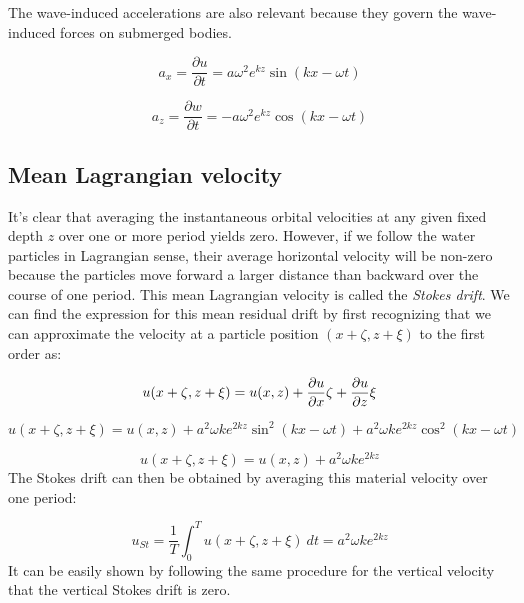 \documentclass[12pt]{article}
\numberwithin{equation}{section}
\numberwithin{figure}{section}
\numberwithin{table}{section}
\begin{document}
The wave-induced accelerations are also relevant because they govern the
wave-induced forces on submerged bodies.

\begin{equation}
  a_x = \frac{\partial u}{\partial t} = a \omega^2 e^{kz} \sin(kx - \omega t)
  \label{eq:wave_horizontal_acceleration}
\end{equation}

\begin{equation}
  a_z = \frac{\partial w}{\partial t} = - a \omega^2 e^{kz} \cos(kx - \omega t)
  \label{eq:wave_vertical_acceleration}
\end{equation}

\subsection{Mean Lagrangian velocity}

It's clear that averaging the instantaneous orbital velocities at any given
fixed depth $z$ over one or more period yields zero.
However, if we follow the water particles in Lagrangian sense, their average
horizontal velocity will be non-zero because the particles move forward a larger
distance than backward over the course of one period.
This mean Lagrangian velocity is called the
\textit{Stokes drift}.
We can find the expression for this mean residual drift by first recognizing
that we can approximate the velocity at a particle position $(x+\zeta, z+\xi)$
to the first order as:

\begin{equation}
  u(x+\zeta, z+\xi) = u(x,z) +
  \frac{\partial u}{\partial x} \zeta +
  \frac{\partial u}{\partial z} \xi \\
\end{equation}

\begin{equation}
  u(x+\zeta, z+\xi) = u(x,z) +
  a^2 \omega k e^{2kz} \sin^2(kx - \omega t) + a^2 \omega k e^{2kz} \cos^2(kx - \omega t)
\end{equation}

\begin{equation}
  u(x+\zeta, z+\xi) = u(x,z) + a^2 \omega k e^{2kz}
\end{equation}
The Stokes drift can then be obtained by averaging this material velocity over
one period:

\begin{equation}
  u_{St} = \frac{1}{T} \int_0^T u(x+\zeta, z+\xi)\ dt = a^2 \omega k e^{2kz}
\end{equation}
It can be easily shown by following the same procedure for the vertical velocity
that the vertical Stokes drift is zero.
\end{document}
